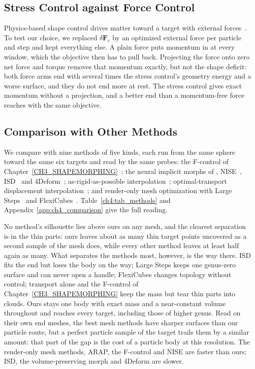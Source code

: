 \subsection{Stress Control against Force Control}
\label{ch4:sec_force}
Physics-based shape control drives matter toward a target with external
forces~\citep{treuille2003keyframe,2004-FluidControlAdjointMethod,10.1145/1015706.1015743,chen2024eigenfluids,li2025flowmapadjoint}.
To test our choice, we replaced $\delta\mathbf{F}_c$ by an optimized external force per particle and step and kept
everything else. A plain force puts momentum in at every window, which the objective then has to pull back. Projecting the
force onto zero net force and torque removes that momentum exactly, but not the shape deficit: both force arms end with
several times the stress control's geometry energy and a worse surface, and they do not end more at rest. The stress
control gives exact momentum without a projection, and a better end than a momentum-free force reaches with the same
objective.

\subsection{Comparison with Other Methods}
\label{ch4:sec_comparison}
We compare with nine methods of five kinds, each run from the same sphere toward the same six targets and read by the same
probes: the F-control of Chapter~\ref{CH3_SHAPEMORPHING}~\citep{11088224}; the neural implicit morphs of
\citet{buonomo2025vpnsm}, NISE~\citep{novello2023nise}, ISD~\citep{sang2025isd} and 4Deform~\citep{sang2025fourdeform};
as-rigid-as-possible interpolation~\citep{2000-ARAPShapeInterpolation}; optimal-transport displacement
interpolation~\citep{mccann1997convexity,bonneel2011displacement}; and render-only mesh optimization with Large
Steps~\citep{nicolet2021largesteps} and FlexiCubes~\citep{shen2023flexicubes}. Table~\ref{ch4:tab_methods} and
Appendix~\ref{app:ch4_comparison} give the full reading.

No method's silhouette lies above ours on any mesh, and the clearest separation is in the thin parts: ours leaves about as
many thin target points uncovered as a second sample of the mesh does, while every other method leaves at least half
again as many. What separates the methods most, however, is the way there. ISD fits the end but loses the body on the way;
Large Steps keeps one genus-zero surface and can never open a handle; FlexiCubes changes topology without control;
transport alone and the F-control of Chapter~\ref{CH3_SHAPEMORPHING} keep the mass but tear thin parts into clouds. Ours
stays one body with exact mass and a near-constant volume throughout and reaches every target, including those of higher
genus. Read on their own end meshes, the best mesh methods have sharper surfaces than our particle route, but a perfect
particle sample of the target trails them by a similar amount: that part of the gap is the cost of a particle body at this
resolution. The render-only mesh methods, ARAP, the F-control and NISE are faster than ours; ISD, the volume-preserving
morph and 4Deform are slower.

